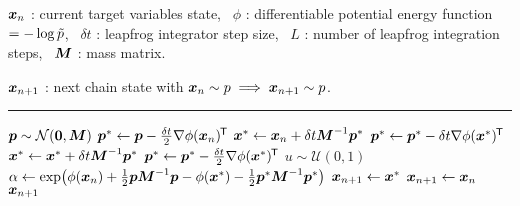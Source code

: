 \begin{algorithmic}
\small
    \Require
    $\boldsymbol{x}_n$ : current target variables state,~
    $\phi$ : differentiable potential energy function $=-\log\tilde{p}$,~
    $\delta t$ : leapfrog integrator step size,~
    $L$ : number of leapfrog integration steps,~
    $\boldsymbol{M}$ : mass matrix.
    \Ensure\raggedright
    $\boldsymbol{x}_{n+1}$ : next chain state with $\boldsymbol{x}_n \sim p \implies \boldsymbol{x}_{n+1} \sim p$.
\end{algorithmic}
\hrule
\small
\begin{algorithmic}[1]
  \State $\vct{p} \sim \nrm{\vct{0}, \mtx{M}}$ 
  \State $\boldsymbol{p}^* \gets \boldsymbol{p} - \frac{\delta t}{2} \nabla\phi(\boldsymbol{x}_n)^{\mkern-1.5mu\mathsf{T}}$ 
  \State $\boldsymbol{x}^* \gets \boldsymbol{x}_n + \delta t \boldsymbol{M}^{-1}\boldsymbol{p}^*$ 
    \State $\boldsymbol{p}^* \gets \boldsymbol{p}^* - \delta t \nabla\phi(\boldsymbol{x}^*)^{\mkern-1.5mu\mathsf{T}}$ 
    \State $\boldsymbol{x}^* \gets \boldsymbol{x}^* + \delta t \boldsymbol{M}^{-1}\boldsymbol{p}^*$ 
  \EndFor
  \State $\boldsymbol{p}^* \gets \boldsymbol{p}^* - \frac{\delta t}{2} \nabla\phi(\boldsymbol{x}^*)^{\mkern-1.5mu\mathsf{T}}$  
  \State $u \sim \mathcal{U}(0,1)$
  \State $\alpha \gets \exp\lpa\phi(\vct{x}_n) + \frac{1}{2}\vct{p}\mtx{M}^{-1}\vct{p} - \phi(\vct{x}^*) - \frac{1}{2}\vct{p}^*\mtx{M}^{-1}\vct{p}^*\rpa$ 
    \State $\boldsymbol{x}_{n+1} \gets \boldsymbol{x}^*$ 
  \Else
    \State $\boldsymbol{x}_{n+1} \gets \boldsymbol{x}_{n}$ 
  \EndIf
  \State \Return $\boldsymbol{x}_{n+1}$
\end{algorithmic}
